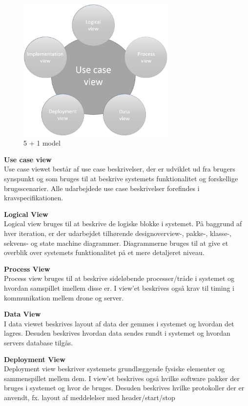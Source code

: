 \begin{figure}[H]
	\centering
	\includegraphics[width=0.7\textwidth]{Billeder/Udviklingsproces/n+1}
	\caption{5 + 1 model}
	\label{fig:n+1}
\end{figure}

\newpage


\textbf{Use case view}\\
Use case viewet består af use case beskrivelser, der er udviklet ud fra brugers synspunkt og som bruges til at beskrive systemets funktionalitet og forskellige brugsscenarier. Alle udarbejdede use case beskrivelser forefindes i kravspecifikationen.

\textbf{Logical View}\\
Logical view bruges til at beskrive de logiske blokke i systemet. På baggrund af hver iteration, er der udarbejdet tilhørende designoverview-, pakke-, klasse-, sekvens- og state machine diagrammer. Diagrammerne bruges til at give et overblik over systemets funktionalitet på et mere detaljeret niveau.

\textbf{Process View}\\
Process view bruges til at beskrive sideløbende processer/tråde i systemet og hvordan samspillet imellem disse er. I view'et beskrives også krav til timing i kommunikation mellem drone og server.

\textbf{Data View}\\
I data viewet beskrives layout af data der gemmes i systemet og hvordan det lagres. Desuden beskrives hvordan data sendes rundt i systemet og hvordan servers database tilgås.

\textbf{Deployment View}\\
Deployment view beskriver systemets grundlæggende fysiske elementer og sammenspillet mellem dem. I view'et beskrives også hvilke software pakker der bruges i systemet og hvor de bruges. Desuden beskrives hvilke protokoller der er anvendt, fx. layout af meddelelser med header/start/stop

